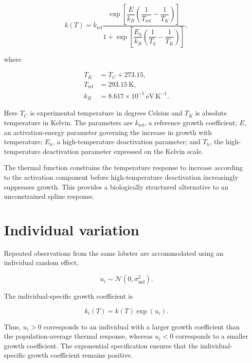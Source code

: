 \documentclass[11pt]{article}
\begin{document}
\begin{equation}
k(T)
=
k_{\mathrm{ref}}
\frac{
\exp\left[
\dfrac{E}{k_B}
\left(
\dfrac{1}{T_{\mathrm{ref}}}
-
\dfrac{1}{T_K}
\right)
\right]
}
{
1+
\exp\left[
\dfrac{E_h}{k_B}
\left(
\dfrac{1}{T_h}
-
\dfrac{1}{T_K}
\right)
\right]
},
\end{equation}

where

\begin{align*}
T_K &= T_C + 273.15,\\
T_{\mathrm{ref}} &= 293.15\ \mathrm{K},\\
k_B &= 8.617\times10^{-5}\ \mathrm{eV\,K^{-1}}.
\end{align*}

Here $T_C$ is experimental temperature in degrees Celsius and $T_K$ is absolute temperature in Kelvin. The parameters are $k_{\mathrm{ref}}$, a reference growth coefficient; $E$, an activation-energy parameter governing the increase in growth with temperature; $E_h$, a high-temperature deactivation parameter; and $T_h$, the high-temperature deactivation parameter expressed on the Kelvin scale.

The thermal function constrains the temperature response to increase according to the activation component before high-temperature deactivation increasingly suppresses growth. This provides a biologically structured alternative to an unconstrained spline response.

\section{Individual variation}

Repeated observations from the same lobster are accommodated using an individual random effect,

\begin{equation}
u_i \sim \mathcal{N}\left(0,\sigma_{\mathrm{ind}}^2\right).
\end{equation}

The individual-specific growth coefficient is

\begin{equation}
k_i(T)=k(T)\exp(u_i).
\end{equation}

Thus, $u_i>0$ corresponds to an individual with a larger growth coefficient than the population-average thermal response, whereas $u_i<0$ corresponds to a smaller growth coefficient. The exponential specification ensures that the individual-specific growth coefficient remains positive.
\end{document}
